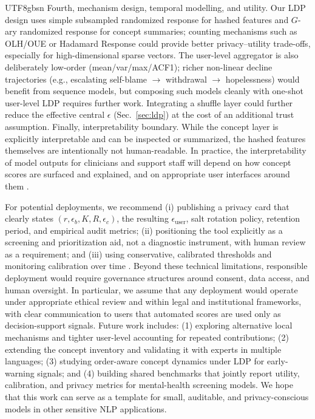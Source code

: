 \documentclass[lettersize,journal]{IEEEtran}
\begin{document}
\begin{CJK*}{UTF8}{gbsn}
Fourth, mechanism design, temporal modelling, and utility. Our LDP design uses simple subsampled randomized response for hashed features and $G$-ary randomized response for concept summaries; counting mechanisms such as OLH/OUE or Hadamard Response \cite{wang2017ldp,acharya2019hr} could provide better privacy--utility trade-offs, especially for high-dimensional sparse vectors. The user-level aggregator is also deliberately low-order (mean/var/max/ACF1); richer non-linear decline trajectories (e.g., escalating self-blame $\rightarrow$ withdrawal $\rightarrow$ hopelessness) would benefit from sequence models, but composing such models cleanly with one-shot user-level LDP requires further work. Integrating a shuffle layer \cite{balle2019shuffle,erlingsson2019shuffle,bittau2017prochlo} could further reduce the effective central $\epsilon$ (Sec.~\ref{sec:ldp}) at the cost of an additional trust assumption.
Finally, interpretability boundary. While the concept layer is explicitly interpretable and can be inspected or summarized, the hashed features themselves are intentionally not human-readable. In practice, the interpretability of model outputs for clinicians and support staff will depend on how concept scores are surfaced and explained, and on appropriate user interfaces around them \cite{koh2020concept}.

For potential deployments, we recommend (i) publishing a privacy card that clearly states $(r,\epsilon_b,K,R,\epsilon_c)$, the resulting $\epsilon_{\text{user}}$, salt rotation policy, retention period, and empirical audit metrics; (ii) positioning the tool explicitly as a screening and prioritization aid, not a diagnostic instrument, with human review as a requirement; and (iii) using conservative, calibrated thresholds and monitoring calibration over time \cite{guo2017calibration}. Beyond these technical limitations, responsible deployment would require governance structures around consent, data access, and human oversight. In particular, we assume that any deployment would operate under appropriate ethical review and within legal and institutional frameworks, with clear communication to users that automated scores are used only as decision-support signals. Future work includes: (1) exploring alternative local mechanisms and tighter user-level accounting for repeated contributions; (2) extending the concept inventory and validating it with experts in multiple languages; (3) studying order-aware concept dynamics under LDP for early-warning signals; and (4) building shared benchmarks that jointly report utility, calibration, and privacy metrics for mental-health screening models. We hope that this work can serve as a template for small, auditable, and privacy-conscious models in other sensitive NLP applications.




\end{CJK*}
\end{document}
